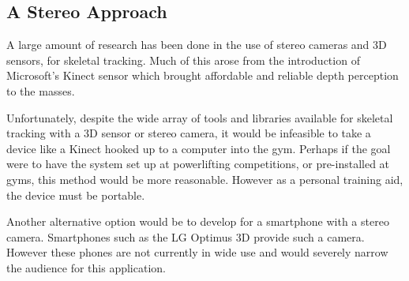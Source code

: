 \subsection{A Stereo Approach}

A large amount of research has been done in the use of stereo cameras and 3D sensors, for skeletal tracking. Much of this arose from the introduction of Microsoft's Kinect\cite{kinect} sensor which brought affordable and reliable depth perception to the masses.




Unfortunately, despite the wide array of tools and libraries available for skeletal tracking with a 3D sensor or stereo camera, it would be infeasible to take a device like a Kinect hooked up to a computer into the gym. Perhaps if the goal were to have the system set up at powerlifting competitions, or pre-installed at gyms, this method would be more reasonable. However as a personal training aid, the device must be portable.

Another alternative option would be to develop for a smartphone with a stereo camera. Smartphones such as the LG Optimus 3D\cite{lgoptimus} provide such a camera. However these phones are not currently in wide use and would severely narrow the audience for this application.

